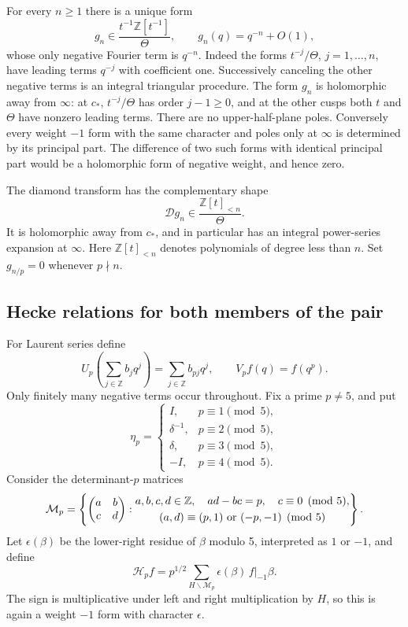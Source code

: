 \documentclass[11pt,a4paper]{article}
\theoremstyle{definition}\newtheorem{definition}[theorem]{Definition}
\theoremstyle{remark}\newtheorem{remark}[theorem]{Remark}
\numberwithin{equation}{section}
\begin{document}
For every \(n\ge1\) there is a unique form
\begin{equation}\label{T:eq:zd-canonical}
 g_n\in\frac{t^{-1}\mathbb Z[t^{-1}]}{\Theta},\qquad
 g_n(q)=q^{-n}+O(1),
\end{equation}
whose only negative Fourier term is \(q^{-n}\).
Indeed the forms \(t^{-j}/\Theta\), \(j=1,\ldots,n\), have leading
terms \(q^{-j}\) with coefficient one.  Successively canceling
the other negative terms is an integral triangular procedure.
The form \(g_n\) is holomorphic away from \(\infty\):
at \(c_*\), \(t^{-j}/\Theta\) has order \(j-1\ge0\), and
at the other cusps both \(t\) and \(\Theta\) have nonzero
leading terms.  There are no upper-half-plane poles.
Conversely every weight \(-1\) form with the same character
and poles only at \(\infty\) is determined by its principal part.
The difference of two such forms with identical principal part
would be a holomorphic form of negative weight, and hence zero.

The diamond transform has the complementary shape
\begin{equation}\label{T:eq:zd-canonical-diamond}
 \mathcal{D}g_n\in
 \frac{\mathbb Z[t]_{<n}}{\Theta}.
\end{equation}
It is holomorphic away from \(c_*\), and in particular has an
integral power-series expansion at \(\infty\).
Here \(\mathbb Z[t]_{<n}\) denotes polynomials of degree less than \(n\).
Set \(g_{n/p}=0\) whenever \(p\nmid n\).

\subsection{Hecke relations for both members of the pair}

For Laurent series define
\[
 U_p\!\left(\sum_{j\in\mathbb Z}b_jq^j\right)
       =\sum_{j\in\mathbb Z}b_{pj}q^j,\qquad
 V_pf(q)=f(q^p).
\]
Only finitely many negative terms occur throughout.
Fix a prime \(p\ne5\), and put
\[
 \eta_p=
 \begin{cases}
 I,&p\equiv1\pmod5,\\
 \delta^{-1},&p\equiv2\pmod5,\\
 \delta,&p\equiv3\pmod5,\\
 -I,&p\equiv4\pmod5.
 \end{cases}
\]
Consider the determinant-\(p\) matrices
\[
 \mathcal{M}_p=
 \left\{\begin{pmatrix}a&b\\c&d\end{pmatrix}:
 \begin{gathered}
 a,b,c,d\in\mathbb Z,\quad ad-bc=p,\quad c\equiv0\pmod5,\\
 (a,d)\equiv(p,1)\ \hbox{or}\ (-p,-1)\pmod5
 \end{gathered}\right\}.
\]
Let \(\epsilon(\beta)\) be the lower-right residue of
\(\beta\) modulo 5, interpreted as \(1\) or \(-1\), and define
\[
 \mathcal{H}_pf
   =p^{1/2}\sum_{H\backslash\mathcal{M}_p}
                  \epsilon(\beta)\,f|_{-1}\beta.
\]
The sign is multiplicative under left and right multiplication
by \(H\), so this is again a weight \(-1\) form with character
\(\epsilon\).
\end{document}
